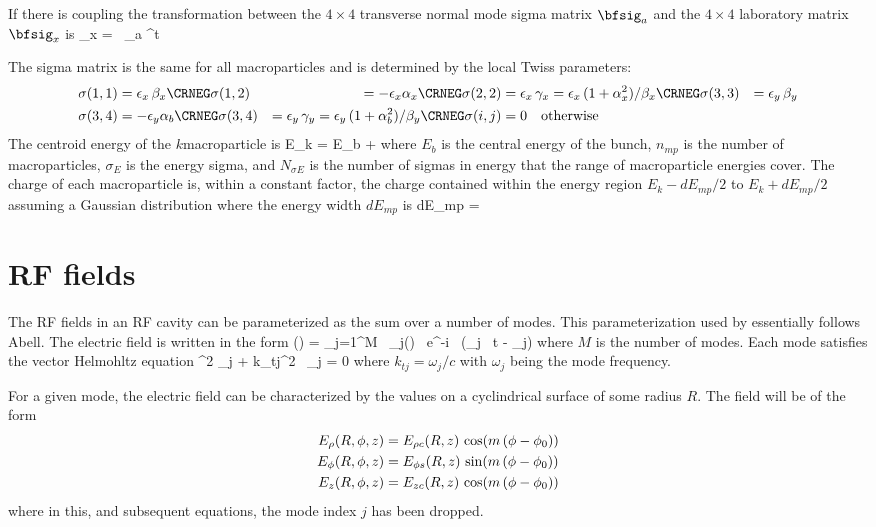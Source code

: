 If there is coupling the transformation between the $4\times 4$
transverse normal mode sigma matrix $\bfsig_a$ and the $4\times 4$
laboratory matrix $\bfsig_x$ is
\Begineq
  \bfsig_x = \bfV \, \bfsig_a \bfV^t
\Endeq

The sigma matrix is the same for all macroparticles and is
determined by the local Twiss parameters:
\begin{align}
  \sigma(1,1) &= \epsilon_x \, \beta_x \CRNEG
  \sigma(1,2) &= -\epsilon_x \alpha_x  \CRNEG
  \sigma(2,2) &= \epsilon_x \, \gamma_x = 
      \epsilon_x \, (1 + \alpha_x^2) / \beta_x \CRNEG
  \sigma(3,3) &= \epsilon_y \, \beta_y \\
  \sigma(3,4) &= -\epsilon_y \alpha_b \CRNEG
  \sigma(3,4) &= \epsilon_y \, \gamma_y = 
      \epsilon_y \, (1 + \alpha_b^2) / \beta_y \CRNEG
  \sigma(i,j) &= 0 \quad \mbox{otherwise} \nonumber
\end{align}
The centroid energy of the $k$\Th macroparticle is
\Begineq
  E_k = E_b + 
\Endeq
where $E_b$ is the central energy of the bunch, $n_{mp}$ is the number
of macroparticles, $\sigma_E$ is the energy sigma, and
$N_{\sigma E}$ is the number of sigmas in energy that the range of
macroparticle energies cover. The charge of each macroparticle is,
within a constant factor, the charge contained within the energy
region $E_k - dE_{mp}/2$ to $E_k + dE_{mp}/2$ assuming a Gaussian
distribution where the energy width $dE_{mp}$ is
\Begineq
  dE_{mp} = 
\Endeq

\section{RF fields}
\label{s:rf.fields.phys}

The RF fields in an RF cavity can be parameterized as the sum over a
number of modes. This parameterization used by \bmad essentially
follows Abell\cite{b:rf.abell}. The electric field is written in the
form
\Begineq
  \bfE(\bfr) = \sum_{j=1}^M \, \bfE_j(\bfr) \, e^{-i \, (\omega_j \, t - \theta_j)}
  \label{eseei}
\Endeq
where $M$ is the number of modes. Each mode satisfies the vector Helmohltz
equation
\Begineq
  \nabla^2 \bfE_j + k_{tj}^2 \, \bfE_j = 0
  \label{bke}
\Endeq
where $k_{tj} = \omega_j/c$ with $\omega_j$ being the mode frequency.

For a given mode, the electric field can be characterized by the values on 
a cyclindrical surface of some radius $R$. The field will be of the form
\begin{align}
  E_\rho(R, \phi, z) &= E_{\rho c}(R, z) \, \cos(m \, (\phi - \phi_0)) \nonumber \\
  E_\phi(R, \phi, z) &= E_{\phi s}(R, z) \, \sin(m \, (\phi - \phi_0)) \\
  \label{erpze}
  E_z(R, \phi, z)    &= E_{z c}(R, z)    \, \cos(m \, (\phi - \phi_0)) \nonumber
\end{align}
where in this, and subsequent equations, the mode index $j$ has been
dropped.

